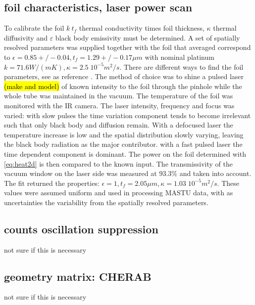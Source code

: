 \subsection{foil characteristics, laser power scan}
To calibrate the foil $k \: t_f$ thermal conductivity times foil thickness, $\kappa$ thermal diffusivity and $\varepsilon$ black body emissivity must be determined. A set of spatially resolved parameters was supplied together with the foil that averaged correspond to $\epsilon=0.85+/-0.04, t_f=1.29+/-0.17 \mu m$ with nominal platinum $k=71.6 W/(mK), \kappa=2.5\;10^{-5}m^2/s$. There are different ways to find the foil parameters, see as reference \cite{Itomi2014}\cite{Cernuschi2001}\cite{Mukai2016}. The method of choice was to shine a pulsed laser \hl{(make and model)} of known intensity to the foil through the pinhole while the whole tube was maintained in the vacuum. The temperature of the foil was monitored with the IR camera. The laser intensity, frequency and focus was varied: with slow pulses the time variation component tends to become irrelevant such that only black body and diffusion remain. With a defocused laser the temperature increase is low and the spatial distribution slowly varying, leaving the black body radiation as the major contributor. with a fast pulsed laser the time dependent component is dominant. The power on the foil determined with \autoref{eq:heat2d} is then compared to the known input. The transmissivity of the vacuum window on the laser side was measured at $93.3\%$ and taken into account. The fit returned the properties: $\epsilon=1, t_f=2.05 \mu m, \kappa=1.03\;10^{-5}m^2/s$. These values were assumed uniform and used in processing MASTU data, with as uncertainties the variability from the spatially resolved parameters.
\subsection{counts oscillation suppression}
not sure if this is necessary
\subsection{geometry matrix: CHERAB}
not sure if this is necessary